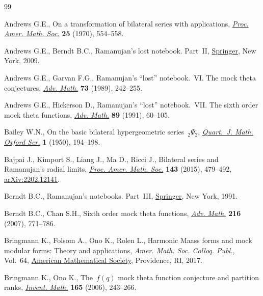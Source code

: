 \begin{thebibliography}{99}
\footnotesize\itemsep=0pt

Andrews G.E., On a transformation of bilateral series with applications,
  \href{https://doi.org/10.2307/2036642}{\textit{Proc. Amer. Math. Soc.}}
  \textbf{25} (1970), 554--558.

Andrews G.E., Berndt B.C., Ramanujan's lost notebook. {P}art~{II},
  \href{https://doi.org/10.1007/b13290}{Springer}, New York, 2009.

Andrews G.E., Garvan F.G., Ramanujan's ``lost'' notebook.~{VI}. {T}he mock
  theta conjectures,
  \href{https://doi.org/10.1016/0001-8708(89)90070-4}{\textit{Adv. Math.}}
  \textbf{73} (1989), 242--255.

Andrews G.E., Hickerson D., Ramanujan's ``lost'' notebook.~{VII}. {T}he sixth
  order mock theta functions,
  \href{https://doi.org/10.1016/0001-8708(91)90083-J}{\textit{Adv. Math.}}
  \textbf{89} (1991), 60--105.

Bailey W.N., On the basic bilateral hypergeometric series~{${}_2\Psi_2$},
  \href{https://doi.org/10.1093/qmath/1.1.194}{\textit{Quart.~J. Math. Oxford
  Ser.}} \textbf{1} (1950), 194--198.

Bajpai J., Kimport S., Liang J., Ma D., Ricci J., Bilateral series and
  {R}amanujan's radial limits,
  \href{https://doi.org/10.1090/S0002-9939-2014-12249-0}{\textit{Proc. Amer.
  Math. Soc.}} \textbf{143} (2015), 479--492,
  \href{http://arxiv.org/abs/2202.12141}{arXiv:2202.12141}.

Berndt B.C., Ramanujan's notebooks. {P}art~{III},
  \href{https://doi.org/10.1007/978-1-4612-0965-2}{Springer}, New York, 1991.

Berndt B.C., Chan S.H., Sixth order mock theta functions,
  \href{https://doi.org/10.1016/j.aim.2007.06.004}{\textit{Adv. Math.}}
  \textbf{216} (2007), 771--786.

Bringmann K., Folsom A., Ono K., Rolen L., Harmonic {M}aass forms and mock
  modular forms: {T}heory and applications, \textit{Amer. Math. Soc. Colloq.
  Publ.}, Vol.~64, \href{https://doi.org/10.1090/coll/064}{American
  Mathematical Society}, Providence, RI, 2017.

Bringmann K., Ono K., The~{$f(q)$} mock theta function conjecture and partition
  ranks, \href{https://doi.org/10.1007/s00222-005-0493-5}{\textit{Invent.
  Math.}} \textbf{165} (2006), 243--266.


\end{thebibliography}
